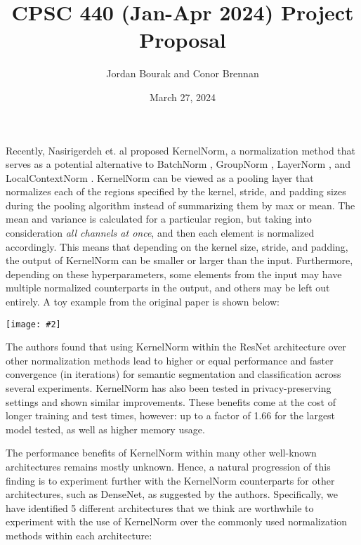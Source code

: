 \documentclass{article}
\title{CPSC 440 (Jan-Apr 2024) Project Proposal}
\author{Jordan Bourak and Conor Brennan}
\date{March 27, 2024}
\newcommand{\centerfig}[2]{\begin{center}\texttt{[image: \#2]}\end{center}}
\begin{document}
\maketitle

Recently, Nasirigerdeh et. al \cite{kernelnorm2024} proposed KernelNorm, a normalization method that serves as a potential alternative to BatchNorm \cite{batchnorm2015}, GroupNorm \cite{groupnorm2018}, LayerNorm \cite{layernorm2015}, and LocalContextNorm \cite{localcontextnorm2020}. KernelNorm can be viewed as a pooling layer that normalizes each of the regions specified by the kernel, stride, and padding sizes during the pooling algorithm instead of summarizing them by max or mean. The mean and variance is calculated for a particular region, but taking into consideration \emph{all channels at once}, and then each element is normalized accordingly. This means that depending on the kernel size, stride, and padding, the output of KernelNorm can be smaller or larger than the input. Furthermore, depending on these hyperparameters, some elements from the input may have multiple normalized counterparts in the output, and others may be left out entirely. A toy example from the original paper is shown below:

\centerfig{0.5}{example.png}

The authors found that using KernelNorm within the ResNet architecture over other normalization methods lead to higher or equal performance and faster convergence (in iterations) for semantic segmentation and classification across several experiments. KernelNorm has also been tested in privacy-preserving settings \cite{kernelnormdp2023} and shown similar improvements. These benefits come at the cost of longer training and test times, however: up to a factor of 1.66 for the largest model tested, as well as higher memory usage.

The performance benefits of KernelNorm within many other well-known architectures remains mostly unknown. Hence, a natural progression of this finding is to experiment further with the KernelNorm counterparts for other architectures, such as DenseNet, as suggested by the authors. Specifically, we have identified 5 different architectures that we think are worthwhile to experiment with the use of KernelNorm over the commonly used normalization methods within each architecture:
\end{document}

